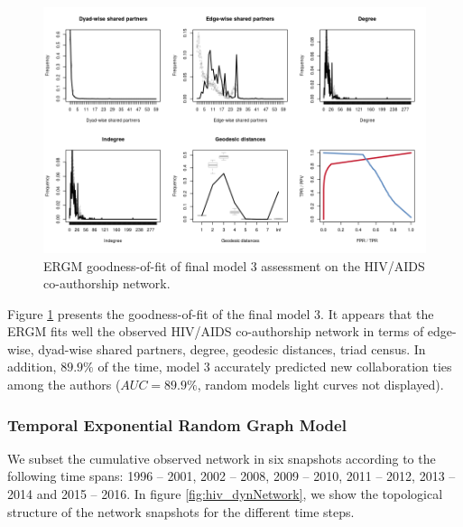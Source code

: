 \begin{figure}[!h]
\centering
\includegraphics[scale=0.65]{Chapters/hiv/statMod/ergm_gof2}
\caption{ERGM goodness-of-fit of final model 3 assessment on the HIV/AIDS co-authorship network.%
}
\label{fig:hiv_ergm-gof}
\end{figure}

Figure \ref{fig:hiv_ergm-gof} presents the goodness-of-fit of the final model 3. It appears that the ERGM fits well the observed HIV/AIDS co-authorship network in terms of edge-wise, dyad-wise shared partners, degree, geodesic distances, triad census. In addition, $89.9\%$ of the time, model 3 accurately predicted new collaboration ties among the authors ($AUC=89.9\%$, random models light curves not displayed).

\subsubsection{Temporal Exponential Random Graph Model}
\label{sec:hiv_results_tergm}
We subset the cumulative observed network in six snapshots according to the following time spans: 1996 -- 2001, 2002 -- 2008, 2009 -- 2010, 2011 -- 2012, 2013 -- 2014 and 2015 -- 2016. In figure \ref{fig:hiv_dynNetwork}, we show the topological structure of the network snapshots for the different time steps.

